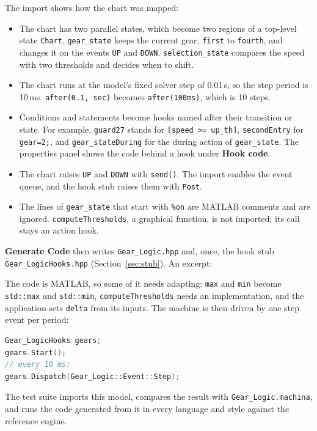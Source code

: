 \documentclass[11pt,a4paper,openany]{report}
\newcommand{\ui}[1]{\textsf{\textbf{#1}}}
\newcommand{\code}[1]{\texttt{#1}}
\begin{document}
The import shows how the chart was mapped:
\begin{itemize}
  \item The chart has two parallel states, which become two regions of a top-level state \code{Chart}.
        \code{gear\_state} keeps the current gear, \code{first} to \code{fourth}, and changes it on the
        events \code{UP} and \code{DOWN}. \code{selection\_state} compares the speed with two thresholds
        and decides when to shift.
  \item The chart runs at the model's fixed solver step of 0.01\,s, so the step period is 10\,ms.
        \code{after(0.1, sec)} becomes \code{after(100ms)}, which is 10 steps.
  \item Conditions and statements become hooks named after their transition or state. For example,
        \code{guard27} stands for \code{[speed >= up\_th]}, \code{secondEntry} for \code{gear=2;}, and
        \code{gear\_stateDuring} for the during action of \code{gear\_state}. The properties panel shows
        the code behind a hook under \ui{Hook code}.
  \item The chart raises \code{UP} and \code{DOWN} with \code{send()}. The import enables the event queue,
        and the hook stub raises them with \code{Post}.
  \item The lines of \code{gear\_state} that start with \code{\%on} are MATLAB comments and are ignored.
        \code{computeThresholds}, a graphical function, is not imported; its call stays an action hook.
\end{itemize}
\ui{Generate Code} then writes \code{Gear\_Logic.hpp} and, once, the hook stub \code{Gear\_LogicHooks.hpp}
(Section~\ref{sec:stub}). An excerpt:

The code is MATLAB, so some of it needs adapting: \code{max} and \code{min} become \code{std::max} and
\code{std::min}, \code{computeThresholds} needs an implementation, and the application sets \code{delta}
from its inputs. The machine is then driven by one step event per period:
\begin{lstlisting}[language=C++]
Gear_LogicHooks gears;
gears.Start();
// every 10 ms:
gears.Dispatch(Gear_Logic::Event::Step);
\end{lstlisting}
The test suite imports this model, compares the result with \code{Gear\_Logic.machina}, and runs the code
generated from it in every language and style against the reference engine.
\end{document}
